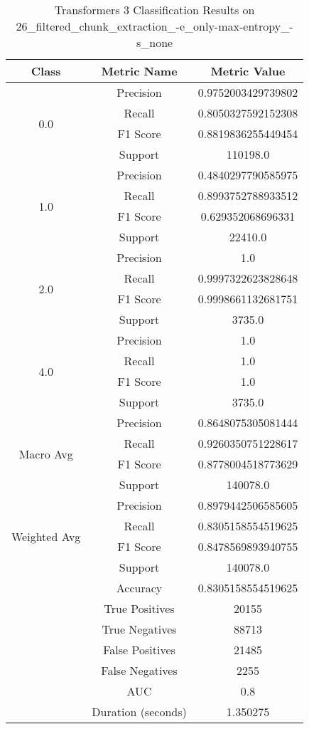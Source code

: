     
    \begin{longtable}{|c|c|c|}
    \caption{Transformers 3 Classification Results on 26\_filtered\_chunk\_extraction\_-e\_only-max-entropy\_-s\_none} \label{tab:transformers_3_classifiers_results} \\
    \hline
    Class & Metric Name & Metric Value \\
    \hline
    \multirow{4}{*}{0.0} & Precision & 0.9752003429739802 \\
     & Recall & 0.8050327592152308 \\
     & F1 Score & 0.8819836255449454 \\
     & Support & 110198.0 \\
    \hline
    \multirow{4}{*}{1.0} & Precision & 0.4840297790585975 \\
     & Recall & 0.8993752788933512 \\
     & F1 Score & 0.629352068696331 \\
     & Support & 22410.0 \\
    \hline
    \multirow{4}{*}{2.0} & Precision & 1.0 \\
     & Recall & 0.9997322623828648 \\
     & F1 Score & 0.9998661132681751 \\
     & Support & 3735.0 \\
    \hline
    \multirow{4}{*}{4.0} & Precision & 1.0 \\
     & Recall & 1.0 \\
     & F1 Score & 1.0 \\
     & Support & 3735.0 \\
    \hline
    \multirow{4}{*}{Macro Avg} & Precision & 0.8648075305081444 \\
     & Recall & 0.9260350751228617 \\
     & F1 Score & 0.8778004518773629 \\
     & Support & 140078.0 \\
    \hline
    \multirow{4}{*}{Weighted Avg} & Precision & 0.8979442506585605 \\
     & Recall & 0.8305158554519625 \\
     & F1 Score & 0.8478569893940755 \\
     & Support & 140078.0 \\
    \hline
    & Accuracy & 0.8305158554519625 \\ \hline
    & True Positives & 20155 \\ \hline
    & True Negatives & 88713 \\ \hline
    & False Positives & 21485 \\ \hline
    & False Negatives & 2255 \\ \hline
    & AUC & 0.8 \\ \hline
    & Duration (seconds) & 1.350275 \\ \hline
    \end{longtable}

